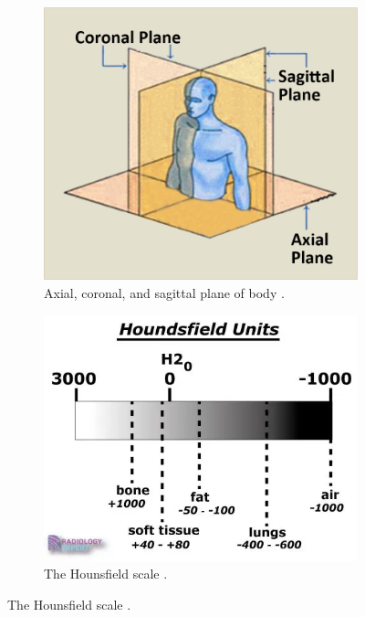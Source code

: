 \begin{figure}[h!]
	\centering
	\begin{subfigure}[t]{0.45\linewidth}
		\centering
		\includegraphics[width=\linewidth]{figures/slices.png}
		\caption{Axial, coronal, and sagittal plane of body \cite{slices}.}
		\label{fig:slices}
	\end{subfigure}
	\hfill
	\begin{subfigure}[t]{0.45\linewidth}
		\centering
		\includegraphics[width=\linewidth]{figures/hounsfield.png}
		\caption{The Hounsfield scale \cite{hounsfield}.}
		\label{fig:hounsfield}
	\end{subfigure}
\end{figure}

